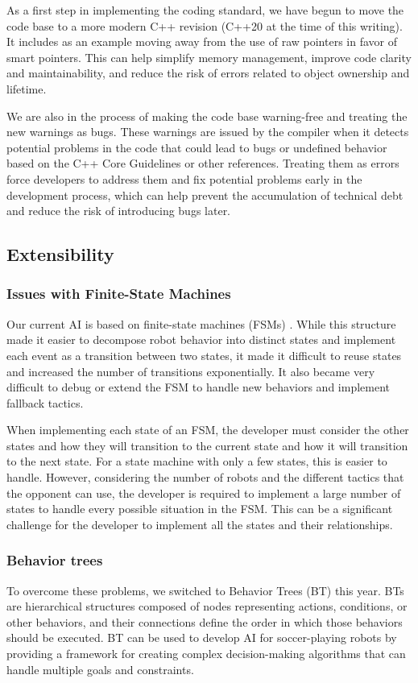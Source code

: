 \documentclass[runningheads]{llncs}
\begin{document}
As a first step in implementing the coding standard, we have begun to move the code base to a more modern C++ revision (C++20 at the time of this writing). It includes as an example moving away from the use of raw pointers in favor of smart pointers. This can help simplify memory management, improve code clarity and maintainability, and reduce the risk of errors related to object ownership and lifetime.

We are also in the process of making the code base warning-free and treating the new warnings as bugs. These warnings are issued by the compiler when it detects potential problems in the code that could lead to bugs or undefined behavior based on the C++ Core Guidelines \cite{ref_cppcoreguidelines} or other references. Treating them as errors force developers to address them and fix potential problems early in the development process, which can help prevent the accumulation of technical debt and reduce the risk of introducing bugs later.

\subsection{Extensibility}

\subsubsection{Issues with Finite-State Machines}
Our current AI is based on finite-state machines (FSMs) \cite{ref_ETDP2020}. While this structure made it easier to decompose robot behavior into distinct states and implement each event as a transition between two states, it made it difficult to reuse states and increased the number of transitions exponentially. It also became very difficult to debug or extend the FSM to handle new behaviors and implement fallback tactics.

When implementing each state of an FSM, the developer must consider the other states and how they will transition to the current state and how it will transition to the next state. For a state machine with only a few states, this is easier to handle. However, considering the number of robots and the different tactics that the opponent can use, the developer is required to implement a large number of states to handle every possible situation in the FSM. This can be a significant challenge for the developer to implement all the states and their relationships.


\subsubsection{Behavior trees}
To overcome these problems, we switched to Behavior Trees (BT) this year. BTs are hierarchical structures composed of nodes representing actions, conditions, or other behaviors, and their connections define the order in which those behaviors should be executed. BT can be used to develop AI for soccer-playing robots by providing a framework for creating complex decision-making algorithms that can handle multiple goals and constraints.
\end{document}
